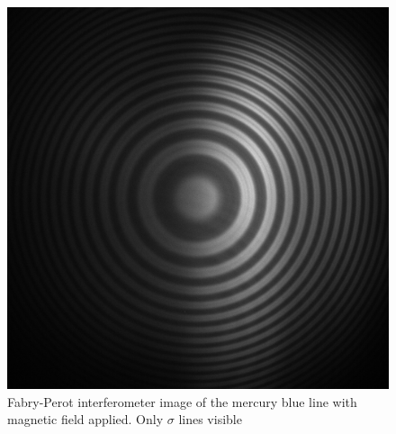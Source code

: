 \documentclass[11pt]{article}
\begin{document}
\begin{figure}[h!]
\begin{minipage}[t]{0.47\linewidth}
        \includegraphics[width=\linewidth]{hg blue sigma lines nearly overlapping.png}
        \captionsetup{justification=centering}
        \caption{Fabry-Perot interferometer image of the mercury blue line with magnetic field applied. Only $\sigma$ lines visible}
        \label{img: Hg blue sigma}
    \end{minipage}
\end{figure}

\newpage
\end{document}
